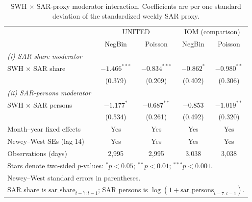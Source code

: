 \begin{table}[!htbp]
\centering
\small
\caption{SWH $\times$ SAR-proxy moderator interaction. Coefficients are per one standard deviation of the standardized weekly SAR proxy.}
\label{tab:mechanism}
\begin{tabular}{lcccc}
\hline
                                 & \multicolumn{2}{c}{UNITED} & \multicolumn{2}{c}{IOM (comparison)} \\
                                 & NegBin & Poisson & NegBin & Poisson \\
\hline
\multicolumn{5}{l}{\textit{(i) SAR-share moderator}} \\
SWH $\times$ SAR share           & $-1.466^{***}$ & $-0.834^{***}$ & $-0.862^{*}$ & $-0.980^{**}$ \\
                                 & (0.379) & (0.209) & (0.402) & (0.306) \\
\multicolumn{5}{l}{\textit{(ii) SAR-persons moderator}} \\
SWH $\times$ SAR persons         & $-1.177^{*}$ & $-0.687^{**}$ & $-0.853$ & $-1.019^{**}$ \\
                                 & (0.534) & (0.261) & (0.492) & (0.320) \\
\hline
Month--year fixed effects        & Yes            & Yes            & Yes           & Yes           \\
Newey--West SEs (lag 14)         & Yes            & Yes            & Yes           & Yes           \\
Observations (days)              & 2,995 & 2,995 & 3,038 & 3,038 \\
\hline
\multicolumn{5}{l}{\footnotesize Stars denote two-sided $p$-values: $^{*}p<0.05$; $^{**}p<0.01$; $^{***}p<0.001$.} \\
\multicolumn{5}{l}{\footnotesize Newey--West standard errors in parentheses.} \\
\multicolumn{5}{l}{\footnotesize SAR share is $\mathrm{sar\_share}_{t-7:t-1}$; SAR persons is $\log(1+\mathrm{sar\_persons}_{t-7:t-1})$.} \\
\end{tabular}
\end{table}
